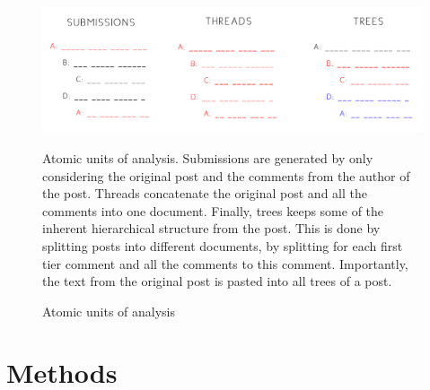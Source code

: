 \documentclass{article}
\begin{document}
\begin{figure}[H]
    \begin{centering}
    \includegraphics[width = \textwidth]{../Figure/atomic_units.jpg}
    \caption{Atomic units of analysis}
    \end{centering}
    \begin{footnotesize} 
        Atomic units of analysis. Submissions are generated by only considering the original post and the comments from the author of the post. Threads concatenate the original post and all the comments into one document. Finally, trees keeps some of the inherent hierarchical structure from the post. This is done by splitting posts into different documents, by splitting for each first tier comment and all the comments to this comment. Importantly, the text from the original post is pasted into all trees of a post.
    \end{footnotesize}
\end{figure}

    \section{Methods}
\end{document}
